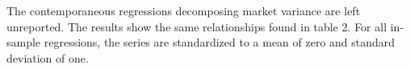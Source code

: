 The contemporaneous regressions decomposing market variance are left unreported. The results show the same relationships found in  \citet{pollet_average_2010} table 2. For all in-sample regressions, the series are standardized to a mean of zero and standard deviation of one.

